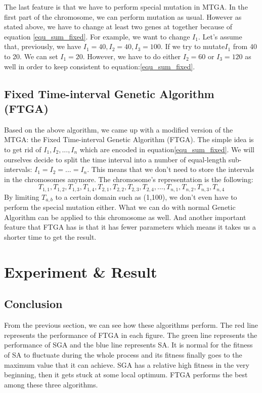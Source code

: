 \documentclass{article} %
\begin{document}
The last feature is that we have to perform special mutation in MTGA. In the first part of the chromosome, we can perform mutation as usual. However as stated above, we have to change at least two genes at together because of equation \ref{equ_sum_fixed}. For example, we want to change ${I_1}$. Let's assume that, previously, we have $I_1 = 40, I_2 = 40, I_3 = 100$. If we try to mutate$I_1$ from 40 to 20. We can set $I_1 = 20$. However, we have to do either $I_2=60$ or $I_3=120$ as well in order to keep consistent to equation:\ref{equ_sum_fixed}. 


\subsection{Fixed Time-interval Genetic Algorithm (FTGA)}
Based on the above algorithm, we came up with a modified version of the MTGA: the Fixed Time-interval Genetic Algorithm (FTGA). The simple idea is to get rid of $I_1, I_2, ..., I_n$ which are encoded in equation\ref{equ_sum_fixed}. We will ourselves decide to split the time interval into a number of equal-length sub-intervals: $I_1=I_2=...=I_n$. This means that we don't need to store the intervals in the chromosomes anymore. The chromosome's representation is the following:
\begin{equation}
T_{1,1}, T_{1,2}, T_{1,3}, T_{1,4},T_{2,1}, T_{2,2}, T_{2,3}, T_{2,4},...,T_{n,1}, T_{n, 2},T_{n,3}, T_{n, 4}
\end{equation}
By limiting $T_{a,b}$ to a certain domain such as (1,100), we don't even have to perform the special mutation either. What we can do with normal Genetic Algorithm can be applied to this chromosome as well. And another important feature that FTGA has is that it has fewer parameters which means it takes us a shorter time to get the result. 


\section{Experiment \& Result}

\subsection{Conclusion}
From the previous section, we can see how these algorithms perform. The red line represents the performance of FTGA in each figure. The green line represents the performance of SGA and the blue line represents SA. It is normal for the fitness of SA to fluctuate during the whole process and its fitness finally goes to the maximum value that it can achieve. SGA has a relative high fitness in the very beginning, then it gets stuck at some local optimum. FTGA performs the best among these three algorithms. 
\end{document}
